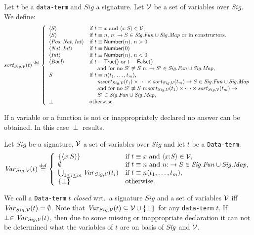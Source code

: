 \documentclass[fleqn,a4paper]{article}
\newcommand{\aterm}[1]{\mathsf{#1}}
\newcommand{\Sig}{\nm{Sig}}
\newcommand{\Fun}{\nm{Fun}}
\newcommand{\wor}{\stackrel{\mathrm{def}}{=}}
\newcommand{\NV}{{\cal V}}
\begin{document}
\begin{defn}
Let $t$ be a {\tt data-term} and $Sig$ a signature. Let $\NV$ be a set
of variables over $Sig$. We define:
\[sort_{Sig,\NV}(t)\wor\left\{
\begin{array}{ll}
\seq{S}&\mbox{if~}t\equiv x\mbox{ and }\langle x\ap S\rangle \in \NV,\\
\seq{S}&\mbox{if $t\equiv n$, $n\ap \rightarrow S\in
\Sig.\Fun\cup\Sig.\Map$ or in constructors.}\\
\seq{\nm{Pos},\nm{Nat},\nm{Int}}&\mbox{if $t\equiv\aterm{Number}(n)$, $n>0$}\\
\seq{\nm{Nat},\nm{Int}}&\mbox{if $t\equiv\aterm{Number}(0)$}\\
\seq{\nm{Int}}&\mbox{if $t\equiv\aterm{Number}(n)$, $n<0$}\\
\seq{\nm{Bool}}&\mbox{if $t\equiv\aterm{True}()$ or $t\equiv\aterm{False}()$}\\
&\hspace*{0.5cm}\mbox{and for no $S'\not\equiv S$}~n\ap \rightarrow
S'\in\Sig.\Fun\cup\Sig.\Map,\\
S&\mbox{if $t\equiv n(t_1,\ldots,t_m)$,}\\
&\mbox{$\hspace{0.5cm}n\ap sort_{Sig,\NV}(t_1)\times \cdots
\times sort_{Sig,\NV}(t_m)\rightarrow S \in \Sig.\Fun\cup\Sig.\Map$}\\
&\hspace{0.5cm}\mbox{and for
no}~S'\not\equiv S~n\ap sort_{Sig,\NV}(t_1)\times \cdots
\times sort_{Sig,\NV}(t_m)\rightarrow\\
&\hspace*{0.5cm}S' \in \Sig.\Fun\cup\Sig.\Map,\\
\perp&\mbox{otherwise}.
\end{array}\right.\]
\end{defn}
If a variable or a function is not or inappropriately declared
no answer can be obtained. In this case $\perp$ results.
\begin{defn}
Let $Sig$ be a signature, $\NV$ a set of
variables over $Sig$ and let $t$ be a {\tt Data-term}.
\[\Var_{Sig,\NV}(t)\wor
\left\{
\begin{array}{ll}
\{\langle x\ap S\rangle\}&\mbox{if }t\equiv x\mbox{ and }\langle
x\ap S\rangle\in \NV,\\
\emptyset&\mbox{if~}t\equiv n\mbox{ and }n\ap \rightarrow S\in
\Sig.\Fun\cup\Sig.\Map,\\
\bigcup_{1\leq i\leq m} \Var_{Sig,\NV}(t_i)&\mbox{if~}t\equiv
n(t_1,\ldots,t_m),\\
\{\perp\}&\mbox{otherwise}.
\end{array}\right.\]
\end{defn}
We call a {\tt Data-term} $t$ {\em closed} wrt.\ a signature
$Sig$ and a set of variables $\NV$ iff $\Var_{Sig,\NV}(t)=
\emptyset$. Note that $\Var_{Sig,\NV}(t)\subseteq\NV\cup\{\perp\}$
for any {\tt data-term} $t$. If $\perp\in \Var_{\Sig,\NV}(t)$, then
due  to some missing or inappropriate declaration
it can not be determined what the variables of $t$ are on basis of
$\Sig$ and $\NV$.
\end{document}
